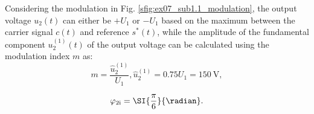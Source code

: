 \begin{solutionblock}
    Considering the modulation in Fig. \ref{sfig:ex07_sub1.1_modulation}, the output voltage $u_\mathrm{2}(t)$ can either be $+U_1$ or $-U_1$ based on
    the maximum between the carrier signal $c(t)$ and reference $s^{*}(t)$, while the amplitude of the fundamental component $u^\mathrm{(1)}_\mathrm{2}(t)$ of the output voltage can be calculated using the modulation
    index $m$ as:
    \begin{equation}
        m = \frac{\hat{u}^\mathrm{(1)}_\mathrm{2}}{U_{\mathrm{1}}}, \hat{u}^\mathrm{(1)}_\mathrm{2} = 0.75 U_{\mathrm{1}} =  \SI{150}{\volt},
        \label{7.1.1:eq:mag_u2_fund}         
    \end{equation}

    \begin{equation}
        \varphi_{2\mathrm{i}} = \SI{\frac{\pi}{6}}{\radian}.
        \label{7.1.1:eq:varphi_2i}         
    \end{equation}
\end{solutionblock}



